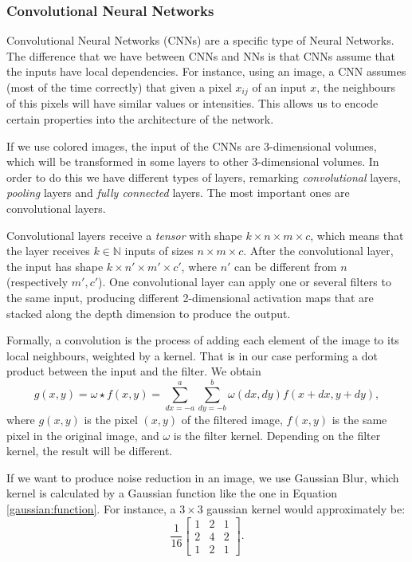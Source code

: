 \subsubsection*{Convolutional Neural Networks}

Convolutional Neural Networks (CNNs) are a specific type of Neural Networks. The difference that we have between CNNs and NNs is that CNNs assume that the inputs have local dependencies. For instance, using an image, a CNN assumes (most of the time correctly) that given a pixel $x_{ij}$ of an input $x$, the neighbours of this pixels will have similar values or intensities. This allows us to encode certain properties into the architecture of the network.

If we use colored images, the input of the CNNs are 3-dimensional volumes, which will be transformed in some layers to other 3-dimensional volumes. In order to do this we have different types of layers, remarking \emph{convolutional} layers, \emph{pooling} layers and \emph{fully connected} layers. The most important ones are convolutional layers.

Convolutional layers receive a \emph{tensor} with shape $k \times n \times m \times c$, which means that the layer receives $k \in \mathbb N$ inputs of sizes $n \times m \times c$.  After the convolutional layer, the input has shape $k \times n' \times m' \times c'$, where $n'$ can be different from $n$ (respectively $m',c'$). One convolutional layer can apply one or several filters to the same input, producing different 2-dimensional activation maps that are stacked along the depth dimension to produce the output.

Formally, a convolution is the process of adding each element of the image to its local neighbours, weighted by a kernel. That is in our case performing a dot product between the input and the filter. We obtain
\[
g(x,y) = \omega \star f(x,y) = \sum_{dx = -a}^a \sum_{dy = -b}^b \omega(dx,dy)f(x+dx,y+dy),    
\]
where $g(x,y)$ is the pixel $(x,y)$ of the filtered image, $f(x,y)$ is the same pixel in the original image, and $\omega$ is the filter kernel. Depending on the filter kernel, the result will be different. 
\begin{nexample}
If we want to produce noise reduction in an image, we use Gaussian Blur, which kernel is calculated by a Gaussian function like the one in Equation \ref{gaussian:function}. For instance, a $3\times 3 $ gaussian kernel would approximately be:
\[
\frac{1}{16}\begin{bmatrix}
    1 & 2 & 1\\
    2 & 4 & 2\\
    1 & 2 & 1
\end{bmatrix}.
\]
\end{nexample}

